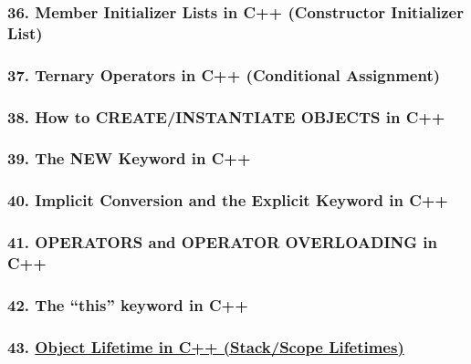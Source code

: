 \documentclass[11pt]{article}
\begin{document}
\hypertarget{member-initializer-lists-in-c-constructor-initializer-list}{%
\subsubsection{36. Member Initializer Lists in C++ (Constructor
Initializer
List)}\label{member-initializer-lists-in-c-constructor-initializer-list}}

\hypertarget{ternary-operators-in-c-conditional-assignment}{%
\subsubsection{37. Ternary Operators in C++ (Conditional
Assignment)}\label{ternary-operators-in-c-conditional-assignment}}

\hypertarget{how-to-createinstantiate-objects-in-c}{%
\subsubsection{38. How to CREATE/INSTANTIATE OBJECTS in
C++}\label{how-to-createinstantiate-objects-in-c}}

\hypertarget{the-new-keyword-in-c}{%
\subsubsection{39. The NEW Keyword in C++}\label{the-new-keyword-in-c}}

\hypertarget{implicit-conversion-and-the-explicit-keyword-in-c}{%
\subsubsection{40. Implicit Conversion and the Explicit Keyword in
C++}\label{implicit-conversion-and-the-explicit-keyword-in-c}}

\hypertarget{operators-and-operator-overloading-in-c}{%
\subsubsection{41. OPERATORS and OPERATOR OVERLOADING in
C++}\label{operators-and-operator-overloading-in-c}}

\hypertarget{the-this-keyword-in-c}{%
\subsubsection{42. The ``this'' keyword in
C++}\label{the-this-keyword-in-c}}

\hypertarget{object-lifetime-in-c-stackscope-lifetimes}{%
\subsubsection{\texorpdfstring{43.
\href{https://www.youtube.com/watch?v=iNuTwvD6ciI}{Object Lifetime in
C++ (Stack/Scope
Lifetimes)}}{43. Object Lifetime in C++ (Stack/Scope Lifetimes)}}\label{object-lifetime-in-c-stackscope-lifetimes}}
\end{document}
